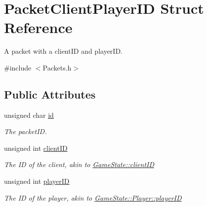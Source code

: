 \hypertarget{struct_packet_client_player_i_d}{\section{Packet\-Client\-Player\-I\-D Struct Reference}
\label{struct_packet_client_player_i_d}
}


A packet with a client\-I\-D and player\-I\-D.  




{\ttfamily \#include $<$Packets.\-h$>$}

\subsection*{Public Attributes}
\begin{DoxyCompactItemize}
\item 
\hypertarget{struct_packet_client_player_i_d_acce86d76b02d18b841377d80849d0f09}{unsigned char \hyperlink{struct_packet_client_player_i_d_acce86d76b02d18b841377d80849d0f09}{id}}\label{struct_packet_client_player_i_d_acce86d76b02d18b841377d80849d0f09}

\begin{DoxyCompactList}\small\item\em The packet\-I\-D. \end{DoxyCompactList}\item 
\hypertarget{struct_packet_client_player_i_d_a7593dcd4306947a847f926db1c214576}{unsigned int \hyperlink{struct_packet_client_player_i_d_a7593dcd4306947a847f926db1c214576}{client\-I\-D}}\label{struct_packet_client_player_i_d_a7593dcd4306947a847f926db1c214576}

\begin{DoxyCompactList}\small\item\em The I\-D of the client, akin to \hyperlink{class_game_state_a7c5acf663dc54a1d6de3254209b8fff2}{Game\-State\-::client\-I\-D} \end{DoxyCompactList}\item 
\hypertarget{struct_packet_client_player_i_d_aba10b2aba2707dc70eb3714c900e516f}{unsigned int \hyperlink{struct_packet_client_player_i_d_aba10b2aba2707dc70eb3714c900e516f}{player\-I\-D}}\label{struct_packet_client_player_i_d_aba10b2aba2707dc70eb3714c900e516f}

\begin{DoxyCompactList}\small\item\em The I\-D of the player, akin to \hyperlink{class_game_state_1_1_player_acbd28d89e6eb8611aa66452ec31e9133}{Game\-State\-::\-Player\-::player\-I\-D} \end{DoxyCompactList}\end{DoxyCompactItemize}


